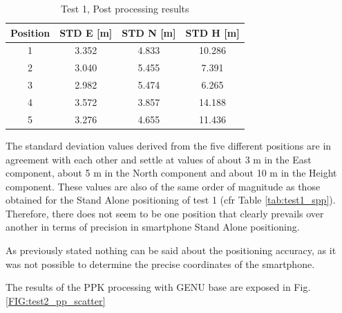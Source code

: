 \begin{table}[H]
	\centering
	\begin{tabular}{|c|c|c|c|}
	\hline
	\textbf{Position} &\textbf{STD E [m]}&\textbf{STD N [m]}&\textbf{STD H [m]}\\
    \hline
	 1 & 3.352 & 4.833  & 10.286\\  
    \hline
     2 & 3.040 & 5.455  & 7.391\\  
    \hline
     3 & 2.982 & 5.474  & 6.265\\  
    \hline
     4 & 3.572 & 3.857  & 14.188\\  
    \hline
     5 & 3.276 & 4.655  & 11.436\\  
    \hline
	\end{tabular} 
	\caption{Test 1, Post processing results}
	\label{tab:test2_sa}
\end{table}

The standard deviation values derived from the five different positions are in agreement with each other and settle at values of about 3 m in the East component, about 5 m in the North component and about 10 m in the Height component. These values are also of the same order of magnitude as those obtained for the Stand Alone positioning of test 1 (cfr Table \ref{tab:test1_spp}). Therefore, there does not seem to be one position that clearly prevails over another in terms of precision in smartphone Stand Alone positioning.

As previously stated nothing can be said about the positioning accuracy, as it was not possible to determine the precise coordinates of the smartphone.

The results of the PPK processing with GENU base are exposed in Fig. \ref{FIG:test2_pp_scatter} 

